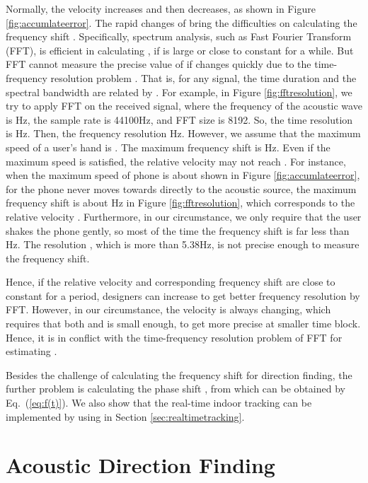 \documentclass[]{sig-alternate-10pt}
\newcommand{\eqqref}[1]{Eq.~(\ref{#1})}
\begin{document}
 Normally, the velocity increases and then decreases, as
shown in Figure \ref{fig:accumlateerror}. The rapid changes of 
bring the difficulties on calculating the frequency shift .
Specifically, spectrum analysis, such as Fast Fourier Transform
(FFT), is efficient in calculating , if  is large or close to constant
for a while. But FFT cannot measure the precise value of  if 
changes quickly due to the time-frequency resolution problem
\cite{claerbout1992earth}. That is, for any signal, the time duration
 and the spectral bandwidth  are related by
.  For example, in Figure
\ref{fig:fftresolution}, we try to apply FFT on the received signal,
where the frequency of the acoustic wave is Hz, the sample
rate is 44100Hz, and FFT size is 8192. So, the time resolution is
Hz. Then, the frequency resolution
Hz. However, we assume that the maximum
speed of a user's hand is 
\cite{2012-MobiSys-SwordFightenablingnew}.
The maximum frequency shift is
Hz. Even if the maximum speed is
satisfied, the relative velocity may not reach . For instance,
when the maximum speed of phone is
about  shown in Figure \ref{fig:accumlateerror}, for the phone
never moves towards directly to the acoustic source, the maximum
frequency shift is about Hz in Figure \ref{fig:fftresolution},
which corresponds to the relative velocity .
Furthermore, in our circumstance, we only require that the user shakes the
phone gently, so most of the time the frequency shift is far less than
Hz.
The resolution , which is more than 5.38Hz, is not precise
enough to measure the frequency shift.

Hence, if the relative velocity and corresponding frequency shift are  
close to constant for a period, designers can increase  to
get better frequency resolution by FFT. However, in our circumstance,
the velocity is always changing, which requires that both 
and  is small enough, to get more precise  at smaller
time block. Hence, it is in conflict with the time-frequency resolution
problem of FFT for estimating .

Besides the challenge of calculating the frequency shift  for direction finding, the
further problem is calculating the phase shift , from which  can be obtained by \eqqref{eq:f(t)}. We also show that the real-time indoor tracking can be implemented by using  in Section \ref{sec:realtimetracking}.




\section{Acoustic Direction Finding}
\label{sec:directionfinding}
\end{document}
